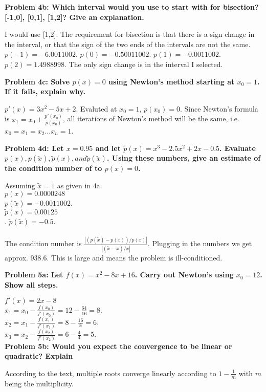 \documentclass[11pt]{article}
\numberwithin{equation}{section}  %
\begin{document}
\noindent\textbf{Problem 4b: Which interval would you use to start with for bisection? [-1,0], [0,1], [1,2]? Give an explanation.}

\noindent I would use [1,2]. The requirement for bisection is that there is a sign change in the interval, or that the sign of the two ends of the intervals are not the same. $p(-1)=-6.0011002$. $p(0)=-0.50011002$. $p(1)=-0.0011002$. $p(2)=1.4988998$. The only sign change is in the interval I selected.
\vspace*{0.25in}

\noindent\textbf{Problem 4c: Solve $p(x)=0$ using Newton's method starting at $x_0=1$. If it fails, explain why.}

\noindent $p'(x)=3x^2-5x+2$. Evaluted at $x_0=1$, $p(x_0)=0$. Since Newton's formula is $x_1=x_0+\frac{p'(x_0)}{p(x_0)}$, all iterations of Newton's method will be the same, i.e. $x_0=x_1=x_2 \ldots x_n=1$.
\vspace*{0.25in}

\noindent\textbf{Problem 4d: Let $x=0.95$ and let $\tilde{p}(x)=x^3-2.5x^2+2x-0.5$. Evaluate $p(x), p(\tilde{x}), \tilde{p}(x), and \tilde{p}(\tilde{x})$. Using these numbers, give an estimate of the condition number of to $p(x)=0$.}

\noindent Assuming $\tilde{x}=1$ as given in 4a.\\
$p(x)=0.0000248$\\
$p(\tilde{x})=-0.0011002$.\\
$\tilde{p}(x)=0.00125$\\.
$\tilde{p}(\tilde{x})=-0.5$.\\
\\
The condition number is $\frac{|(p(\tilde{x})-p(x))/p(x)|}{|(\tilde{x}-x)/x|}$. Plugging in the numbers we get approx. 938.6. This is large and means the problem is ill-conditioned.
\vspace*{0.25in}

\noindent\textbf{Problem 5a: Let $f(x) = x^2 - 8x + 16$. Carry out Newton's using $x_0=12$. Show all steps.}

\noindent $f'(x)=2x-8$\\
$x_1=x_0-\frac{f(x_0)}{f'(x_0)}=12-\frac{64}{16}=8$.\\
$x_2=x_1-\frac{f(x_1)}{f'(x_1)}=8-\frac{16}{8}=6$.\\
$x_3=x_2-\frac{f(x_2)}{f'(x_2)}=6-\frac{4}{4}=5$.\\

\vspace*{0.25in}
\noindent\textbf{Problem 5b: Would you expect the convergence to be linear or quadratic? Explain}

\noindent According to the text, multiple roots converge linearly according to $1-\frac{1}{m}$ with $m$ being the multiplicity.
\end{document}
